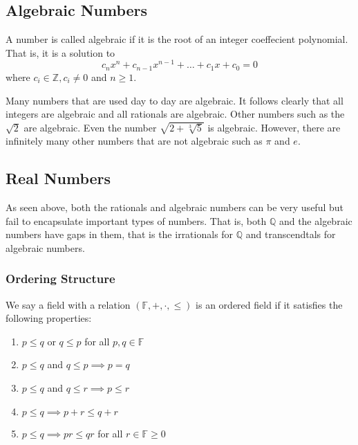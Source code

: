 \documentclass[../notes.tex]{subfiles}
\begin{document}
\subsection{Algebraic Numbers}

\begin{definition}
	A number is called algebraic if it is the root of an integer coeffecient polynomial. That is, it is a solution to
	\[
		c_{n} x^n + c_{n-1} x^{n-1} + \ldots + c_1 x + c_0 = 0
	\]
	where $c_i \in \mathbb{Z}, c_i \neq 0$ and $n \geq 1$.
\end{definition}

Many numbers that are used day to day are algebraic. It follows clearly that all integers are algebraic and all rationals are algebraic. Other numbers such as the $\sqrt{2}$ are algebraic. Even the number $\sqrt{2 + \sqrt[3]{5}}$ is algebraic. However, there are infinitely many other numbers that are not algebraic such as $\pi$ and $e$.

\subsection*{Real Numbers}

As seen above, both the rationals and algebraic numbers can be very useful but fail to encapsulate important types of numbers. That is, both $\mathbb{Q}$ and the algebraic numbers have gaps in them, that is the irrationals for $\mathbb{Q}$ and transcendtals for algebraic numbers.
\subsubsection{Ordering Structure}
\begin{definition}
	We say a field with a relation $(\mathbb{F}, +, \cdot, \leq)$ is an ordered field if it satisfies the following properties:
	\begin{enumerate}
		\item $p \leq q$ or $q \leq p$ for all $p,q \in \mathbb{F}$
		\item $p \leq q$ and $q \leq p \implies p = q$ 
		\item $p \leq q$ and $q \leq r \implies p \leq r$
		\item $p \leq q \implies p + r \leq q + r$ 
		\item $p \leq q \implies pr \leq qr$ for all $r \in \mathbb{F} \geq 0$ 
	\end{enumerate}
\end{definition}
\end{document}
